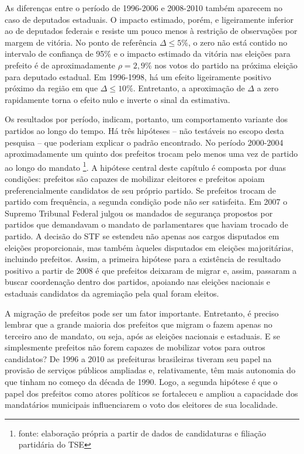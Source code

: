 As diferenças entre o período de 1996-2006 e 2008-2010 também aparecem no caso de deputados estaduais. O impacto estimado, porém, e ligeiramente inferior ao de deputados federais e resiste um pouco menos à restrição de observações por margem de vitória. No ponto de referência $\Delta \leq 5\%$, o zero não está contido no intervalo de confiança de 95\% e o impacto estimado da vitória nas eleições para prefeito é de aproximadamente $\rho=2,9\%$ nos votos do partido na próxima eleição para deputado estadual. Em 1996-1998, há um efeito ligeiramente positivo próximo da região em que $\Delta \leq 10\%$. Entretanto, a aproximação de $\Delta$ a zero rapidamente torna o efeito nulo e inverte o sinal da estimativa.

Os resultados por período, indicam, portanto, um comportamento variante dos partidos ao longo do tempo. Há três hipóteses -- não testáveis no escopo desta pesquisa -- que poderiam explicar o padrão encontrado. No período 2000-2004 aproximadamente um quinto dos prefeitos trocam pelo menos uma vez de partido ao longo do mandato \footnote{fonte: elaboração própria a partir de dados de candidaturas e filiação partidária do TSE}. A hipótese central deste capítulo é composta por duas condições: prefeitos são capazes de mobilizar eleitores e prefeitos apoiam preferencialmente candidatos de seu próprio partido. Se prefeitos trocam de partido com frequência, a segunda condição pode não ser satisfeita. Em 2007 o Supremo Tribunal Federal julgou os mandados de segurança propostos por partidos que demandavam o mandato de parlamentares que haviam trocado de partido. A decisão do STF se estendeu não apenas aos cargos disputados em eleições proporcionais, mas também àqueles disputados em eleições majoritárias, incluindo prefeitos. Assim, a primeira hipótese para a existência de resultado positivo a partir de 2008 é que prefeitos deixaram de migrar e, assim, passaram a buscar coordenação dentro dos partidos, apoiando nas eleições nacionais e estaduais candidatos da agremiação pela qual foram eleitos.

A migração de prefeitos pode ser um fator importante. Entretanto, é preciso lembrar que a grande maioria dos prefeitos que migram o fazem apenas no terceiro ano de mandato, ou seja, após as eleições nacionais e estaduais. E se simplesmente prefeitos não forem capazes de mobilizar votos para outros candidatos? De 1996 a 2010 as prefeituras brasileiras tiveram seu papel na provisão de serviços públicos ampliadas e, relativamente, têm mais autonomia do que tinham no começo da década de 1990. Logo, a segunda hipótese é que o papel dos prefeitos como atores políticos se fortaleceu e ampliou a capacidade dos mandatários municipais influenciarem o voto dos eleitores de sua localidade.

